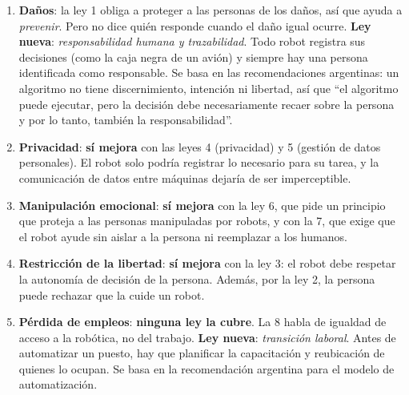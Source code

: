 \documentclass[11pt,a4paper]{article}
\begin{document}
\begin{enumerate}
  \item \textbf{Daños}: la ley 1 obliga a proteger a las personas de los daños, así que ayuda a \emph{prevenir}. Pero no dice quién responde cuando el daño igual ocurre. \textbf{Ley nueva}: \emph{responsabilidad humana y trazabilidad}. Todo robot registra sus decisiones (como la caja negra de un avión) y siempre hay una persona identificada como responsable. Se basa en las recomendaciones argentinas: un algoritmo no tiene discernimiento, intención ni libertad, así que ``el algoritmo puede ejecutar, pero la decisión debe necesariamente recaer sobre la persona y por lo tanto, también la responsabilidad''.
  \item \textbf{Privacidad}: \textbf{sí mejora} con las leyes 4 (privacidad) y 5 (gestión de datos personales). El robot solo podría registrar lo necesario para su tarea, y la comunicación de datos entre máquinas dejaría de ser imperceptible.
  \item \textbf{Manipulación emocional}: \textbf{sí mejora} con la ley 6, que pide un principio que proteja a las personas manipuladas por robots, y con la 7, que exige que el robot ayude sin aislar a la persona ni reemplazar a los humanos.
  \item \textbf{Restricción de la libertad}: \textbf{sí mejora} con la ley 3: el robot debe respetar la autonomía de decisión de la persona. Además, por la ley 2, la persona puede rechazar que la cuide un robot.
  \item \textbf{Pérdida de empleos}: \textbf{ninguna ley la cubre}. La 8 habla de igualdad de acceso a la robótica, no del trabajo. \textbf{Ley nueva}: \emph{transición laboral}. Antes de automatizar un puesto, hay que planificar la capacitación y reubicación de quienes lo ocupan. Se basa en la recomendación argentina para el modelo de automatización.
\end{enumerate}
\end{document}
